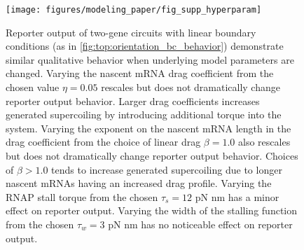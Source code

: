 \documentclass[11pt]{article}
\begin{document}
\begin{figure}[hbtp]
    \centering
    {\texttt{[image: figures/modeling\_paper/fig\_supp\_hyperparam]}
    \label{fig:hyperparam_drag_coeff}
    \label{fig:hyperparam_drag_exponent}
    \label{fig:hyperparam_stall_torque}
    \label{fig:hyperparam_stall_width}
    }
    \caption{Reporter output of two-gene circuits with linear boundary conditions (as in \cref{fig:top:orientation_bc_behavior}) demonstrate similar qualitative behavior when underlying model parameters are changed.
         Varying the nascent mRNA drag coefficient from the chosen value \(\eta = 0.05\) rescales but does not dramatically change reporter output behavior. Larger drag coefficients increases generated supercoiling by introducing additional torque into the system.
         Varying the exponent on the nascent mRNA length in the drag coefficient from the choice of linear drag \(\beta = 1.0\) also rescales but does not dramatically change reporter output behavior. Choices of \(\beta > 1.0\) tends to increase generated supercoiling due to longer nascent mRNAs having an increased drag profile.
         Varying the RNAP stall torque from the chosen \(\tau_s = 12\) pN nm has a minor effect on reporter output.
         Varying the width of the stalling function from the chosen \(\tau_w = 3\) pN nm has no noticeable effect on reporter output.
    }
    \label{fig:top:hyperparam}
\end{figure}
\end{document}
